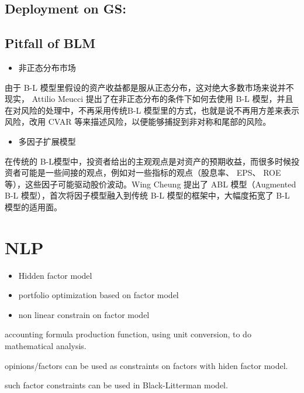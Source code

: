 \documentclass[presentation]{beamer}
\begin{document}
\subsection{Deployment on GS:}
\label{sec:orgheadline32}


\subsection{Pitfall of BLM}
\label{sec:orgheadline33}
\begin{itemize}
\item 非正态分布市场
\end{itemize}
由于 B-L 模型里假设的资产收益都是服从正态分布，这对绝大多数市场来说并不现实， Attilio Meucci 提出了在非正态分布的条件下如何去使用 B-L 模型，并且在对风险的处理中，不再采用传统B-L 模型里的方式，也就是说不再用方差来表示风险，改用 CVAR 等来描述风险，以便能够捕捉到非对称和尾部的风险。

\begin{itemize}
\item 多因子扩展模型
\end{itemize}
在传统的 B-L模型中，投资者给出的主观观点是对资产的预期收益，而很多时候投资者可能是一些间接的观点，例如对一些指标的观点（股息率、 EPS、 ROE 等），这些因子可能驱动股价波动。Wing Cheung 提出了 ABL 模型（Augmented B-L 模型），首次将因子模型融入到传统 B-L 模型的框架中，大幅度拓宽了 B-L 模型的适用面。

\section{NLP}
\label{sec:orgheadline35}
\begin{itemize}
\item Hidden factor model
\item portfolio optimization based on factor model
\item non linear constrain on factor model
\end{itemize}

accounting formula production function, using unit conversion, to do mathematical analysis.

opinions/factors can be used as constraints on factors with hiden factor model.

such factor constraints can be used in Black-Litterman model.
\end{document}

